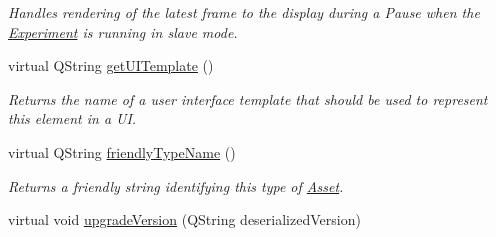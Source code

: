 \begin{DoxyCompactItemize}
\begin{DoxyCompactList}\small\item\em Handles rendering of the latest frame to the display during a Pause when the \hyperlink{class_picto_1_1_experiment}{Experiment} is running in slave mode. \end{DoxyCompactList}\item 
\hypertarget{class_picto_1_1_pause_point_aa30efd030e05c5edb877e3b886690eaa}{virtual Q\-String \hyperlink{class_picto_1_1_pause_point_aa30efd030e05c5edb877e3b886690eaa}{get\-U\-I\-Template} ()}\label{class_picto_1_1_pause_point_aa30efd030e05c5edb877e3b886690eaa}

\begin{DoxyCompactList}\small\item\em Returns the name of a user interface template that should be used to represent this element in a U\-I. \end{DoxyCompactList}\item 
virtual Q\-String \hyperlink{class_picto_1_1_pause_point_ae574eb10c179e20038dad24dbc2bbc75}{friendly\-Type\-Name} ()
\begin{DoxyCompactList}\small\item\em Returns a friendly string identifying this type of \hyperlink{class_picto_1_1_asset}{Asset}. \end{DoxyCompactList}\item 
\hypertarget{class_picto_1_1_pause_point_a625ce981ccecd8ce3efc0b38264c49a7}{virtual void \hyperlink{class_picto_1_1_pause_point_a625ce981ccecd8ce3efc0b38264c49a7}{upgrade\-Version} (Q\-String deserialized\-Version)}\label{class_picto_1_1_pause_point_a625ce981ccecd8ce3efc0b38264c49a7}


\end{DoxyCompactItemize}
